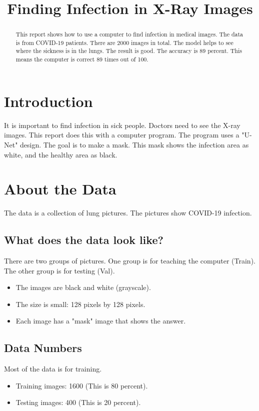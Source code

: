 \documentclass[conference]{IEEEtran}
\title{Finding Infection in X-Ray Images}
\author{\IEEEauthorblockN{Lab 3 Report}
\IEEEauthorblockA{\textit{Medical Machine Learning}}}
\begin{document}
\maketitle

\begin{abstract}
This report shows how to use a computer to find infection in medical images. The data is from COVID-19 patients. There are 2000 images in total. The model helps to see where the sickness is in the lungs. The result is good. The accuracy is 89 percent. This means the computer is correct 89 times out of 100.
\end{abstract}

\section{Introduction}
It is important to find infection in sick people. Doctors need to see the X-ray images. This report does this with a computer program. The program uses a "U-Net" design. The goal is to make a mask. This mask shows the infection area as white, and the healthy area as black.

\section{About the Data}
The data is a collection of lung pictures. The pictures show COVID-19 infection.

\subsection{What does the data look like?}
There are two groups of pictures. One group is for teaching the computer (Train). The other group is for testing (Val).
\begin{itemize}
    \item The images are black and white (grayscale).
    \item The size is small: 128 pixels by 128 pixels.
    \item Each image has a "mask" image that shows the answer.
\end{itemize}

\subsection{Data Numbers}
Most of the data is for training.
\begin{itemize}
    \item Training images: 1600 (This is 80 percent).
    \item Testing images: 400 (This is 20 percent).
\end{itemize}
\end{document}

